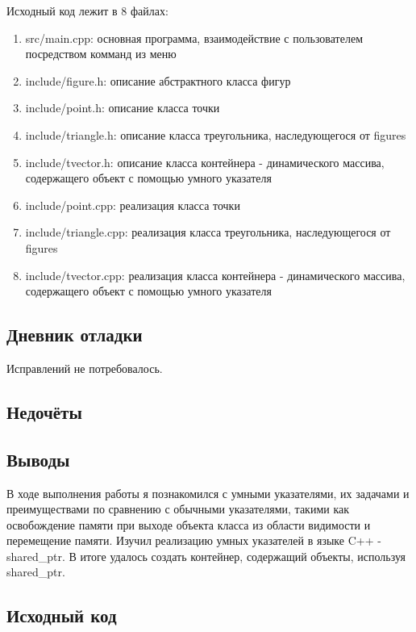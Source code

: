 \documentclass[12pt]{article}
\begin{document}
Исходный код лежит в 8 файлах:
\begin{enumerate}
\item src/main.cpp: основная программа, взаимодействие с пользователем посредством комманд из меню

\item include/figure.h:    описание абстрактного класса фигур

\item include/point.h:     описание класса точки
\item include/triangle.h:  описание класса треугольника, наследующегося от figures
\item include/tvector.h:     описание класса контейнера - динамического массива, содержащего объект с помощью умного указателя

\item include/point.cpp:     реализация класса точки
\item include/triangle.cpp:  реализация класса треугольника, наследующегося от figures
\item include/tvector.cpp: реализация класса контейнера - динамического массива, содержащего объект с помощью умного указателя

\end{enumerate}

\subsection*{Дневник отладки}
Исправлений не потребовалось.


\subsection*{Недочёты}


\subsection*{Выводы}
В ходе выполнения работы я познакомился с умными указателями, их задачами и преимуществами по сравнению с обычными указателями, такими как освобождение памяти при выходе объекта класса из области видимости и перемещение памяти. Изучил реализацию умных указателей в языке C++ - shared\_ptr. В итоге удалось создать контейнер, содержащий объекты, используя shared\_ptr.


\vfill

\subsection*{Исходный код}
\end{document}
